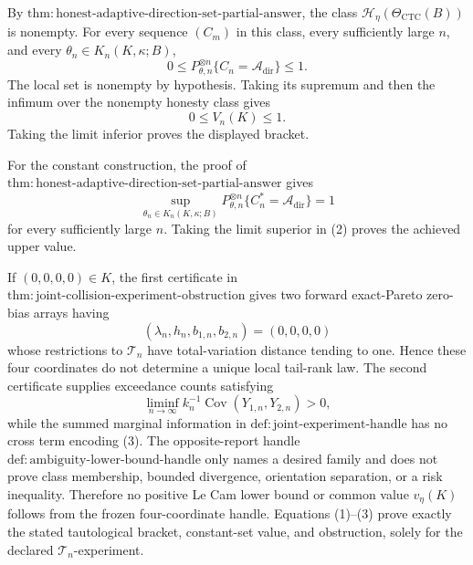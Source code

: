 By \(\mathrm{thm{:}honest\text{-}adaptive\text{-}direction\text{-}set\text{-}partial\text{-}answer}\), the class \(\mathcal H_\eta(\Theta_{\mathrm{CTC}}(B))\) is nonempty.  For every sequence \((C_m)\) in this class, every sufficiently large \(n\), and every \(\theta_n\in K_n(K,\kappa;B)\),
\[
 0\leq P_{\theta,n}^{\otimes n}\{C_n=\mathcal A_{\mathrm{dir}}\}\leq1.
\]
The local set is nonempty by hypothesis.  Taking its supremum and then the infimum over the nonempty honesty class gives
\[
 0\leq V_n(K)\leq1. \tag{1}
\]
Taking the limit inferior proves the displayed bracket.

For the constant construction, the proof of \(\mathrm{thm{:}honest\text{-}adaptive\text{-}direction\text{-}set\text{-}partial\text{-}answer}\) gives
\[
 \sup_{\theta_n\in K_n(K,\kappa;B)}
 P_{\theta,n}^{\otimes n}\{C_n^*=\mathcal A_{\mathrm{dir}}\}=1 \tag{2}
\]
for every sufficiently large \(n\).  Taking the limit superior in (2) proves the achieved upper value.

If \((0,0,0,0)\in K\), the first certificate in \(\mathrm{thm{:}joint\text{-}collision\text{-}experiment\text{-}obstruction}\) gives two forward exact-Pareto zero-bias arrays having
\[
 (\lambda_n,h_n,b_{1,n},b_{2,n})=(0,0,0,0)
\]
whose restrictions to \(\mathcal T_n\) have total-variation distance tending to one.  Hence these four coordinates do not determine a unique local tail-rank law.  The second certificate supplies exceedance counts satisfying
\[
 \liminf_{n\to\infty}k_n^{-1}
 \operatorname{Cov}(Y_{1,n},Y_{2,n})>0, \tag{3}
\]
while the summed marginal information in \(\mathrm{def{:}joint\text{-}experiment\text{-}handle}\) has no cross term encoding (3).  The opposite-report handle \(\mathrm{def{:}ambiguity\text{-}lower\text{-}bound\text{-}handle}\) only names a desired family and does not prove class membership, bounded divergence, orientation separation, or a risk inequality.  Therefore no positive Le Cam lower bound or common value \(v_\eta(K)\) follows from the frozen four-coordinate handle.  Equations (1)--(3) prove exactly the stated tautological bracket, constant-set value, and obstruction, solely for the declared \(\mathcal T_n\)-experiment.